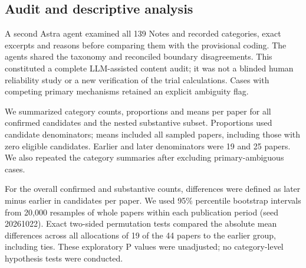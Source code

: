 \documentclass[11pt,a4paper]{article}
\begin{document}
\subsection{Audit and descriptive analysis}
A second Astra agent examined all 139 Notes and recorded categories, exact excerpts and reasons before comparing them with the provisional coding. The agents shared the taxonomy and reconciled boundary disagreements. This constituted a complete LLM-assisted content audit; it was not a blinded human reliability study or a new verification of the trial calculations. Cases with competing primary mechanisms retained an explicit ambiguity flag.\par
We summarized category counts, proportions and means per paper for all confirmed candidates and the nested substantive subset. Proportions used candidate denominators; means included all sampled papers, including those with zero eligible candidates. Earlier and later denominators were 19 and 25 papers. We also repeated the category summaries after excluding primary-ambiguous cases.\par
For the overall confirmed and substantive counts, differences were defined as later minus earlier in candidates per paper. We used 95\% percentile bootstrap intervals from 20,000 resamples of whole papers within each publication period (seed 20261022). Exact two-sided permutation tests compared the absolute mean differences across all allocations of 19 of the 44 papers to the earlier group, including ties. These exploratory P values were unadjusted; no category-level hypothesis tests were conducted.\par
\end{document}
